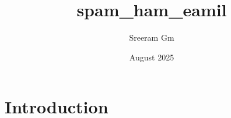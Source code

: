 \documentclass{article}
\title{spam_ham_eamil}
\author{Sreeram Gm}
\date{August 2025}
\begin{document}
\maketitle

\section{Introduction}
\end{document}
